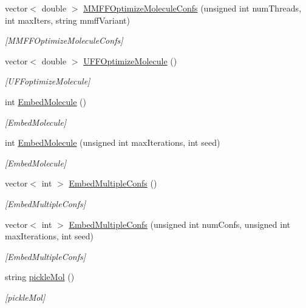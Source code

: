 \begin{DoxyCompactItemize}
vector$<$ double $>$ \mbox{\hyperlink{class_molecule_a839e0ee89e2355a5451cd0f8fdff0a90}{M\+M\+F\+F\+Optimize\+Molecule\+Confs}} (unsigned int num\+Threads, int max\+Iters, string mmff\+Variant)
\begin{DoxyCompactList}\small\item\em \mbox{[}M\+M\+F\+F\+Optimize\+Molecule\+Confs\mbox{]} \end{DoxyCompactList}\item 
vector$<$ double $>$ \mbox{\hyperlink{class_molecule_a5a7fe2f265ee8e8d4aeebfd41bf0ebdc}{U\+F\+F\+Optimize\+Molecule}} ()
\begin{DoxyCompactList}\small\item\em \mbox{[}U\+F\+Foptimize\+Molecule\mbox{]} \end{DoxyCompactList}\item 
int \mbox{\hyperlink{class_molecule_ab5b0afe25fe921c55a3a9ccd3de78b08}{Embed\+Molecule}} ()
\begin{DoxyCompactList}\small\item\em \mbox{[}Embed\+Molecule\mbox{]} \end{DoxyCompactList}\item 
int \mbox{\hyperlink{class_molecule_a49385d99cee0aba8c758a1420ba7c88d}{Embed\+Molecule}} (unsigned int max\+Iterations, int seed)
\begin{DoxyCompactList}\small\item\em \mbox{[}Embed\+Molecule\mbox{]} \end{DoxyCompactList}\item 
vector$<$ int $>$ \mbox{\hyperlink{class_molecule_a05d32198715c54d6db4c139e4c9a3985}{Embed\+Multiple\+Confs}} ()
\begin{DoxyCompactList}\small\item\em \mbox{[}Embed\+Multiple\+Confs\mbox{]} \end{DoxyCompactList}\item 
vector$<$ int $>$ \mbox{\hyperlink{class_molecule_a3364337cff6c6a4d382f8653da23a54f}{Embed\+Multiple\+Confs}} (unsigned int num\+Confs, unsigned int max\+Iterations, int seed)
\begin{DoxyCompactList}\small\item\em \mbox{[}Embed\+Multiple\+Confs\mbox{]} \end{DoxyCompactList}\item 
string \mbox{\hyperlink{class_molecule_a24d8a0ae44766a09fa4f245f61a22dc2}{pickle\+Mol}} ()
\begin{DoxyCompactList}\small\item\em \mbox{[}pickle\+Mol\mbox{]} \end{DoxyCompactList}\item 

\end{DoxyCompactItemize}
